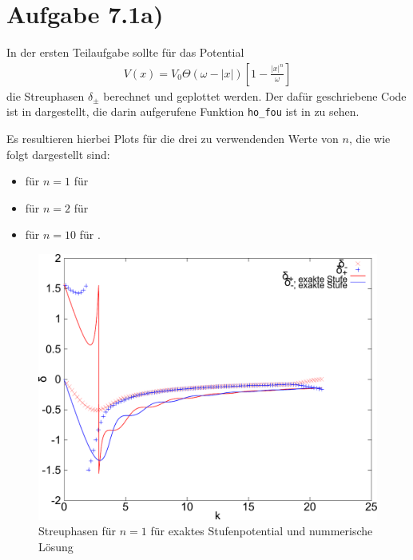 \section*{Aufgabe 7.1a)}
In der ersten Teilaufgabe sollte für das Potential
\begin{eqnarray}
V(x) = V_0 \Theta(ω-|x|)\left[ 1-\frac{|x|^n}{ω} \right]
\end{eqnarray}
die Streuphasen $δ_{\pm}$ berechnet und geplottet werden. Der dafür geschriebene
Code ist in  dargestellt, die darin aufgerufene Funktion \texttt{ho\_fou}
ist in  zu sehen.




Es resultieren hierbei Plots für die drei zu verwendenden Werte von $n$, die wie
folgt dargestellt sind:
\begin{itemize}
\item für $n=1$ für 
\item für $n=2$ für 
\item für $n=10$ für .
\end{itemize}

\begin{figure}[htb]
  \centering
  \includegraphics[width=0.75\columnwidth,keepaspectratio]{../tmp/71a_n1-crop}
  \caption{Streuphasen für $n=1$ für exaktes Stufenpotential und nummerische Lösung}
  \label{fig:n1}
\end{figure}

